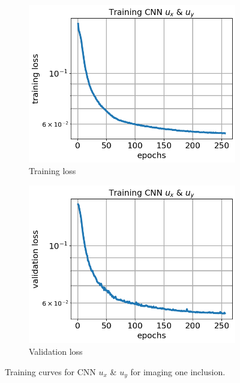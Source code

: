 \documentclass[12pt]{article}
\newcommand{\nhgfigheight}{4.0cm}
\begin{document}
\begin{figure}[h]
  \centering
  \begin{subfigure}[b]{0.45\linewidth}
    \includegraphics[totalheight=\nhgfigheight]{Figures/final1/training/uxuy/field_images_plot_loss.png}
    \caption{Training loss}
  \end{subfigure}
  \begin{subfigure}[b]{0.45\linewidth}
    \includegraphics[totalheight=\nhgfigheight]{Figures/final1/training/uxuy/field_images_plot_val_loss.png}
    \caption{Validation loss}
  \end{subfigure}
  \caption{\label{fig:oneinc:trainuxuy} Training curves for CNN $u_x$ \& $u_y$ for imaging one inclusion.}
\end{figure}
\end{document}

